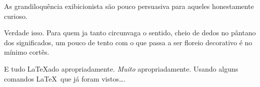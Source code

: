 As grandiloquência exibicionista são 
pouco persuasiva para aqueles honestamente 
curioso.
   
Verdade                           isso. 
Para         quem         ja tanto 
circunvaga o sentido, cheio de dedos no 
pântano dos significados, um pouco de tento 
com o que passa a ser floreio decorativo é 
no mínimo cortês.

E tudo \LaTeX ado apropriadamente. 
\emph{Muito} apropriadamente.
Usando alguns comandos \LaTeX\ que já foram 
vistos\dots.

